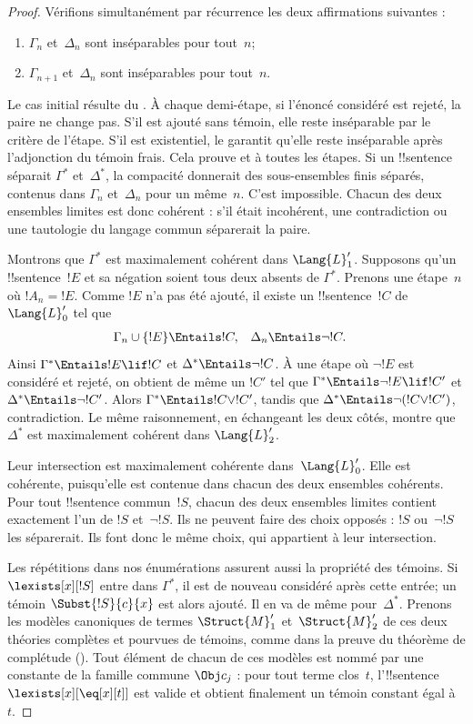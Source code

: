 \documentclass[../../../include/open-logic-section]{subfiles}
\begin{document}
\begin{proof}
Vérifions simultanément par récurrence
les deux affirmations suivantes :
\begin{enumerate}
\item{}
  $\Gamma_n$ et~$\Delta_n$ sont
  inséparables pour tout~$n$;
\item{}
  $\Gamma_{n+1}$ et~$\Delta_n$
  sont inséparables pour tout~$n$.
\end{enumerate}
Le cas initial résulte du
. À chaque
demi-étape, si l'énoncé considéré
est rejeté, la paire ne change pas.
S'il est ajouté sans témoin, elle
reste inséparable par le critère
de l'étape. S'il est existentiel,
le  garantit
qu'elle reste inséparable après
l'adjonction du témoin frais.
Cela prouve  et
 à toutes les étapes.
Si un !!{sentence} séparait
$\Gamma^*$ et~$\Delta^*$, la
compacité donnerait des sous-ensembles
finis séparés, contenus dans
$\Gamma_n$ et~$\Delta_n$ pour un
même~$n$. C'est impossible.
Chacun des deux ensembles limites
est donc cohérent : s'il était
incohérent, une contradiction ou
une tautologie du langage commun
séparerait la paire.

Montrons que $\Gamma^*$ est
maximalement cohérent dans
$\Lang{L}'_1$. Supposons qu'un
!!{sentence}~$!E$ et sa négation
soient tous deux absents de
$\Gamma^*$. Prenons une étape~$n$
où $!A_n=!E$. Comme $!E$ n'a pas
été ajouté, il existe un
!!{sentence}~$!C$ de~$\Lang{L}'_0$
tel que
\begin{align*}
  \Gamma_n\cup\{!E\}&\Entails !C,
  &
  \Delta_n&\Entails\lnot !C.
\end{align*}
Ainsi $\Gamma^*\Entails !E\lif !C$
et $\Delta^*\Entails\lnot !C$.
À une étape où $\lnot !E$ est
considéré et rejeté, on obtient
de même un $!C'$ tel que
$\Gamma^*\Entails\lnot !E\lif !C'$
et $\Delta^*\Entails\lnot !C'$.
Alors $\Gamma^*\Entails !C\lor !C'$,
tandis que
$\Delta^*\Entails\lnot(!C\lor !C')$,
contradiction. Le même raisonnement,
en échangeant les deux côtés,
montre que $\Delta^*$ est
maximalement cohérent dans
$\Lang{L}'_2$.

Leur intersection est maximalement
cohérente dans~$\Lang{L}'_0$.
Elle est cohérente, puisqu'elle
est contenue dans chacun des deux
ensembles cohérents. Pour tout
!!{sentence} commun~$!S$, chacun
des deux ensembles limites contient
exactement l'un de $!S$ et~$\lnot !S$.
Ils ne peuvent faire des choix
opposés : $!S$ ou~$\lnot !S$
les séparerait. Ils font donc
le même choix, qui appartient
à leur intersection.

Les répétitions dans nos
énumérations assurent aussi la
propriété des témoins. Si
$\lexists[x][!S]$ entre dans
$\Gamma^*$, il est de nouveau
considéré après cette entrée;
un témoin $\Subst{!S}{c}{x}$
est alors ajouté. Il en va de
même pour~$\Delta^*$. Prenons
les modèles canoniques de termes
$\Struct{M}'_1$ et~$\Struct{M}'_2$
de ces deux théories complètes et
pourvues de témoins, comme dans
la preuve du théorème de complétude
().
Tout élément de chacun de ces
modèles est nommé par une constante de la famille commune $\Obj c_j$ :
pour tout terme clos~$t$, l'!!{sentence} $\lexists[x][\eq[x][t]]$
est valide et obtient finalement
un témoin constant égal à~$t$.


\end{proof}
\end{document}
